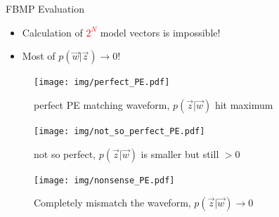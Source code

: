 \documentclass[final]{beamer}
\newlength{\colwidth}
\begin{document}
\begin{frame}[t]
\begin{columns}[t]
\begin{column}{\colwidth}
\begin{block}{FBMP Evaluation}
    \begin{itemize}
        \item Calculation of \textcolor{red}{$2^{N}$} model vectors is impossible!
        \item Most of $p(\vec{w}|\vec{z}) \rightarrow 0$!
    \end{itemize}
    \noindent\begin{minipage}[c]{0.33\textwidth}
        \begin{figure}[H]
            \centering
                \texttt{[image: img/perfect\_PE.pdf]}
            \caption{perfect PE matching waveform, $p(\vec{z}|\vec{w})$ hit maximum}
            \label{fig:perfect PE}
        \end{figure}
    \end{minipage}\begin{minipage}[c]{0.33\textwidth}
        \begin{figure}[H]
            \centering
                \texttt{[image: img/not\_so\_perfect\_PE.pdf]}
            \caption{not so perfect, $p(\vec{z}|\vec{w})$ is smaller but still $>0$}
            \label{fig:not so perfect PE}
        \end{figure}
    \end{minipage}\begin{minipage}[c]{0.33\textwidth}
        \begin{figure}[H]
            \centering
                \texttt{[image: img/nonsense\_PE.pdf]}
            \caption{Completely mismatch the waveform, $p(\vec{z}|\vec{w}) \rightarrow 0$}
            \label{fig:nonsense PE}
        \end{figure}
    \end{minipage}


\end{block}
\end{column}
\end{columns}
\end{frame}
\end{document}
